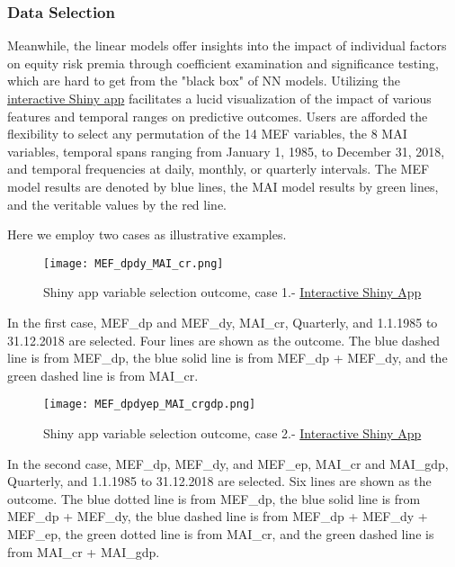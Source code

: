 \documentclass{article}
\begin{document}
\subsubsection{Data Selection}
Meanwhile, the linear models offer insights into the impact of individual factors on equity risk premia through coefficient examination and significance testing, which are hard to get from the "black box" of NN models. Utilizing the \href{https://baumender11.shinyapps.io/Alpha/}{interactive Shiny app} facilitates a lucid visualization of the impact of various features and temporal ranges on predictive outcomes. Users are afforded the flexibility to select any permutation of the 14 MEF variables, the 8 MAI variables, temporal spans ranging from January 1, 1985, to December 31, 2018, and temporal frequencies at daily, monthly, or quarterly intervals. The MEF model results are denoted by blue lines, the MAI model results by green lines, and the veritable values by the red line.

\noindent Here we employ two cases as illustrative examples.

\begin{figure}[H]
    \centering \texttt{[image: MEF\_dpdy\_MAI\_cr.png]}
    \caption{Shiny app variable selection outcome, case 1.- \href{https://baumender11.shinyapps.io/Alpha/}{Interactive Shiny App}}
\end{figure}

\noindent In the first case, MEF\_dp and MEF\_dy, MAI\_cr, Quarterly, and 1.1.1985 to 31.12.2018 are selected. Four lines are shown as the outcome. The blue dashed line is from MEF\_dp, the blue solid line is from MEF\_dp + MEF\_dy, and the green dashed line is from MAI\_cr. 

\begin{figure}[H]
    \centering \texttt{[image: MEF\_dpdyep\_MAI\_crgdp.png]}
    \caption{Shiny app variable selection outcome, case 2.- \href{https://baumender11.shinyapps.io/Alpha/}{Interactive Shiny App}}
\end{figure}

\noindent In the second case, MEF\_dp, MEF\_dy, and MEF\_ep, MAI\_cr and MAI\_gdp, Quarterly, and 1.1.1985 to 31.12.2018 are selected. Six lines are shown as the outcome. The blue dotted line is from MEF\_dp, the blue solid line is from MEF\_dp + MEF\_dy, the blue dashed line is from MEF\_dp + MEF\_dy + MEF\_ep, the green dotted line is from MAI\_cr, and the green dashed line is from MAI\_cr + MAI\_gdp. 
\end{document}
